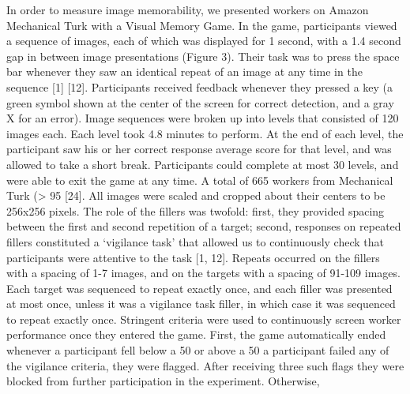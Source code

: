 In order to measure image memorability, we presented workers on Amazon Mechanical Turk with a Visual Memory Game. In the game, participants viewed a sequence of images, each of which was displayed for 1 second, with a 1.4 second gap in between image presentations (Figure 3). Their task was to press the space bar whenever they saw an identical repeat of an image at any time in the sequence [1] [12]. Participants received feedback whenever they pressed a key (a green symbol shown at the center of the screen for correct detection, and a gray X for an error). Image sequences were broken up into levels that consisted of 120 images each. Each level took 4.8 minutes to perform. At the end of each level, the participant saw his or her correct response average score for that level, and was allowed to take a short break. Participants could complete at most 30 levels, and were able to exit the game at any time. A total of 665 workers from Mechanical Turk (> 95%
[24]. All images were scaled and cropped about their centers to be 256x256 pixels. The role of the fillers was twofold: first, they provided spacing between the first and second
repetition of a target; second, responses on repeated fillers constituted a ‘vigilance task’ that allowed us to continuously check that participants were attentive to the task
[1, 12]. Repeats occurred on the fillers with a spacing of 1-7 images, and on the targets with a spacing of 91-109 images. Each target was sequenced to repeat exactly once, and each
filler was presented at most once, unless it was a vigilance task filler, in which case it was sequenced to repeat exactly once. Stringent criteria were used to continuously screen
worker performance once they entered the game. First, the game automatically ended whenever a participant fell below a 50%
or above a 50%
a participant failed any of the vigilance criteria, they were flagged. After receiving three such flags they were blocked from further participation in the experiment. Otherwise,
